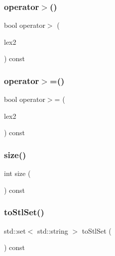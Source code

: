 \mbox{\label{classDawgLexicon_ad36b61790c0aa454fddf60d15b52b158}} 
\subsubsection{\texorpdfstring{operator$>$()}{operator>()}}
{\footnotesize\ttfamily bool operator$>$ (\begin{DoxyParamCaption}\item[{const \mbox{\hyperlink{classDawgLexicon}{Dawg\+Lexicon}} \&}]{lex2 }\end{DoxyParamCaption}) const}

\mbox{\label{classDawgLexicon_af4f0508490235ae1af1b9234ac9fe01d}} 
\subsubsection{\texorpdfstring{operator$>$=()}{operator>=()}}
{\footnotesize\ttfamily bool operator$>$= (\begin{DoxyParamCaption}\item[{const \mbox{\hyperlink{classDawgLexicon}{Dawg\+Lexicon}} \&}]{lex2 }\end{DoxyParamCaption}) const}

\mbox{\label{classDawgLexicon_af9593d4a5ff4274efaf429cb4f9e57cc}} 
\subsubsection{\texorpdfstring{size()}{size()}}
{\footnotesize\ttfamily int size (\begin{DoxyParamCaption}{ }\end{DoxyParamCaption}) const}

\mbox{\label{classDawgLexicon_a56b9ca7800c467295cab333fd9815291}} 
\subsubsection{\texorpdfstring{to\+Stl\+Set()}{toStlSet()}}
{\footnotesize\ttfamily std\+::set$<$ std\+::string $>$ to\+Stl\+Set (\begin{DoxyParamCaption}{ }\end{DoxyParamCaption}) const}

